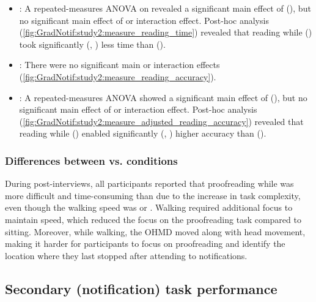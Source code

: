 \begin{itemize}
    \item \readingTime{}: A repeated-measures ANOVA on \readingTime{} revealed a significant main effect of \mobility{} (), but no significant main effect of \animation{} or interaction effect. Post-hoc analysis (\autoref{fig:GradNotif:study2:measure_reading_time}) revealed that reading while \sitting{} () took significantly (, ) less time than \walking{} ().

    \item \readingAccuracy{}: There were no significant main or interaction effects (\autoref{fig:GradNotif:study2:measure_reading_accuracy}).

    \item \adjustedReadingAccuracy{}: A repeated-measures ANOVA showed a significant main effect of \mobility{} (), but no significant main effect of \animation{} or interaction effect. Post-hoc analysis (\autoref{fig:GradNotif:study2:measure_adjusted_reading_accuracy}) revealed that reading while \sitting{} () enabled significantly (, ) higher accuracy than \walking{} ().
    
\end{itemize}


\subsubsection*{Differences between \sitting{} vs. \walking{} conditions}
\label{sec:GradNotif:study2:task_difference}

During post-interviews, all participants reported that proofreading while \walking{} was more difficult and time-consuming than \sitting{} due to the increase in task complexity, even though the walking speed was  or . Walking required additional focus to maintain speed, which reduced the focus on the proofreading task compared to sitting. Moreover, while walking, the OHMD moved along with head movement, making it harder for participants to focus on proofreading and identify the location where they last stopped after attending to notifications.



\subsection{Secondary (notification) task performance}
\label{sec:GradNotif:study2:results_secondary_task}

